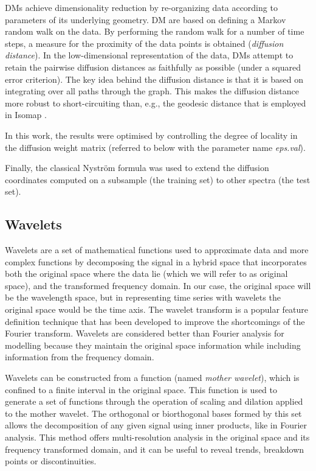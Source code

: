\documentclass[a4paper,fleqn,usenatbib]{mnras}
\begin{document}
{DMs achieve dimensionality reduction by re-organizing data according
to parameters of its underlying geometry. DM are based on defining a
Markov random walk on the data. By performing the random walk for a
number of time steps, a measure for the proximity of the data points
is obtained (\textit{diffusion distance}). In the low-dimensional
representation of the data, DMs attempt to retain the pairwise
diffusion distances as faithfully as possible (under a squared error
criterion). The key idea behind the diffusion distance is that it is
based on integrating over all paths through the graph. This makes the
diffusion distance more robust to short-circuiting than, e.g., the
geodesic distance that is employed in Isomap \citep{tenenbaum:00}.

In this work, the results were optimised by controlling the degree of
locality in the diffusion weight matrix (referred to below with 
the parameter name \textit{eps.val}).

Finally, the classical Nystr\"{o}m formula \citep{NIPS2000_1866} was used
to extend the diffusion coordinates computed on a subsample (the training 
set) to other spectra (the test set).


\subsection{Wavelets}

Wavelets \citep{mallat:98} are a set of mathematical functions used to
approximate data and more complex functions by decomposing the signal
in a hybrid space that incorporates both the original space where the
data lie (which we will refer to as original space), and the
transformed frequency domain. In our case, the original space will be
the wavelength space, but in representing time series with wavelets
the original space would be the time axis. The wavelet transform is a
popular feature definition technique that has been developed to
improve the shortcomings of the Fourier transform. Wavelets are
considered better than Fourier analysis for modelling because they
maintain the original space information while including information
from the frequency domain.

Wavelets can be constructed from a function (named \textit{mother
  wavelet}), which is confined to a finite interval in the original
space. This function is used to generate a set of functions through
the operation of scaling and dilation applied to the mother
wavelet. The orthogonal or biorthogonal bases formed by this set
allows the decomposition of any given signal using inner products,
like in Fourier analysis. This method offers multi-resolution analysis
in the original space and its frequency transformed domain, and it can
be useful to reveal trends, breakdown points or discontinuities.

}
\end{document}
